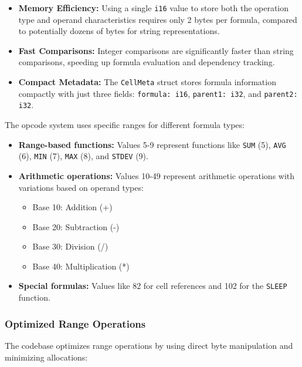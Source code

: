 \documentclass[11pt,a4paper]{article}
\begin{document}
\begin{itemize}
  \item \textbf{Memory Efficiency:} Using a single \lstinline{i16} value to store both the operation type and operand characteristics requires only 2 bytes per formula, compared to potentially dozens of bytes for string representations.
  
  \item \textbf{Fast Comparisons:} Integer comparisons are significantly faster than string comparisons, speeding up formula evaluation and dependency tracking.
  
  \item \textbf{Compact Metadata:} The \lstinline{CellMeta} struct stores formula information compactly with just three fields: \lstinline{formula: i16}, \lstinline{parent1: i32}, and \lstinline{parent2: i32}.
\end{itemize}

The opcode system uses specific ranges for different formula types:

\begin{itemize}
  \item \textbf{Range-based functions:} Values 5-9 represent functions like \lstinline{SUM} (5), \lstinline{AVG} (6), \lstinline{MIN} (7), \lstinline{MAX} (8), and \lstinline{STDEV} (9).
  
  \item \textbf{Arithmetic operations:} Values 10-49 represent arithmetic operations with variations based on operand types:
    \begin{itemize}
      \item Base 10: Addition (+)
      \item Base 20: Subtraction (-)
      \item Base 30: Division (/)
      \item Base 40: Multiplication (*)
    \end{itemize}
    
  \item \textbf{Special formulas:} Values like 82 for cell references and 102 for the \lstinline{SLEEP} function.
\end{itemize}

\subsubsection{Optimized Range Operations}

The codebase optimizes range operations by using direct byte manipulation and minimizing allocations:
\end{document}
